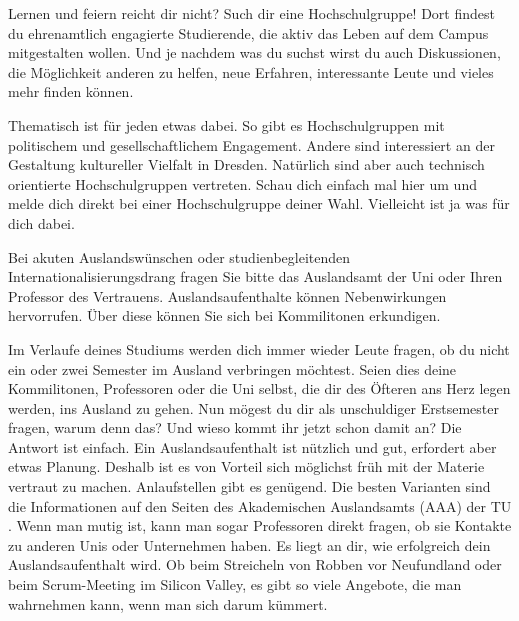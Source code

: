 
Lernen und feiern reicht dir nicht? 
Such dir eine Hochschulgruppe!
Dort findest du ehrenamtlich engagierte Studierende, die aktiv das Leben auf
dem Campus mitgestalten wollen.
Und je nachdem was du suchst wirst du auch Diskussionen, die Möglichkeit anderen zu helfen, neue Erfahren, interessante Leute und vieles mehr finden können.

Thematisch ist für jeden etwas dabei. 
So gibt es Hochschulgruppen mit politischem und gesellschaftlichem Engagement. 
Andere sind interessiert an der Gestaltung kultureller Vielfalt in Dresden. 
Natürlich sind aber auch technisch orientierte Hochschulgruppen vertreten.
Schau dich einfach mal hier  um und melde dich direkt bei einer Hochschulgruppe deiner Wahl. 
Vielleicht ist ja was für dich dabei.



Bei akuten Auslandswünschen oder studienbegleitenden Internationalisierungsdrang fragen Sie bitte das Auslandsamt der Uni oder Ihren Professor des Vertrauens. 
Auslandsaufenthalte können Nebenwirkungen hervorrufen. 
Über diese können Sie sich bei Kommilitonen erkundigen.

Im Verlaufe deines Studiums werden dich immer wieder Leute fragen, ob du nicht ein oder zwei Semester im Ausland verbringen möchtest. 
Seien dies deine Kommilitonen, Professoren oder die Uni selbst, die dir des Öfteren ans Herz legen werden, ins Ausland zu gehen. 
Nun mögest du dir als unschuldiger Erstsemester fragen, warum denn das? 
Und wieso kommt ihr jetzt schon damit an? 
Die Antwort ist einfach. 
Ein Auslandsaufenthalt ist nützlich und gut, erfordert aber etwas Planung. 
Deshalb ist es von Vorteil sich möglichst früh mit der Materie vertraut zu machen. 
Anlaufstellen gibt es genügend. 
Die besten Varianten sind die Informationen auf den Seiten des Akademischen Auslandsamts (AAA) der TU . 
Wenn man mutig ist, kann man sogar Professoren direkt fragen, ob sie Kontakte zu anderen Unis oder Unternehmen haben. 
Es liegt an dir, wie erfolgreich dein Auslandsaufenthalt wird. 
Ob beim Streicheln von Robben vor Neufundland oder beim Scrum-Meeting im Silicon Valley, es gibt so viele Angebote, die man wahrnehmen kann, wenn man sich darum kümmert.
